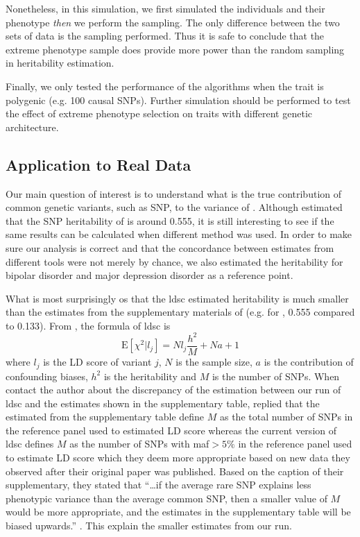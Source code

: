 \documentclass[12pt]{scrbook}
\newcommand*{\glng}{\glsentrylong}
\begin{document}
Nonetheless, in this simulation, we first simulated the individuals and their phenotype \emph{then} we perform the sampling.
The only difference between the two sets of data is the sampling performed.
Thus it is safe to conclude that the extreme phenotype sample does provide more power than the random sampling in heritability estimation.

Finally, we only tested the performance of the algorithms when the trait is polygenic (e.g. 100 causal \glspl{SNP}).
Further simulation should be performed to test the effect of extreme phenotype selection on traits with different genetic architecture. 

\subsection{Application to Real Data}
Our main question of interest is to understand what is the true contribution of common genetic variants, such as \gls{SNP}, to the variance of \glng{scz}.
Although \citet{Bulik-Sullivan2015c} estimated that the \gls{SNP} heritability of \glng{scz} is around 0.555, it is still interesting to see if the same results can be calculated when different method was used. 
In order to make sure our analysis is correct and that the concordance between estimates from different tools were not merely by chance, we also estimated the heritability for bipolar disorder and major depression disorder as a reference point.

What is most surprisingly os that the \gls{ldsc} estimated heritability is much smaller than the estimates from the supplementary materials of \citet{Bulik-Sullivan2015} (e.g. for \glng{scz}, 0.555 compared to 0.133).
From \citet{Bulik-Sullivan2015}, the formula of \gls{ldsc} is
\begin{equation}
\mathrm{E}[\chi^2|l_j] = Nl_j\frac{h^2}{M}+Na+1
\end{equation}
where $l_j$ is the \gls{LD} score of variant $j$, $N$ is the sample size, $a$ is the contribution of confounding biases, $h^2$ is the heritability and $M$ is the number of \glspl{SNP}.
When contact the author about the discrepancy of the estimation between our run of \gls{ldsc} and the estimates shown in the supplementary table, \citet{Bulik-Sullivan2015c} replied that the estimated from the supplementary table define $M$ as the total number of \glspl{SNP} in the reference panel used to estimated \gls{LD} score whereas the current version of \gls{ldsc} defines $M$ as the number of \glspl{SNP} with \gls{maf}$ >5\%$ in the reference panel used to estimate \gls{LD} score which they deem more appropriate based on new data they observed after their original paper was published.
Based on the caption of their supplementary, they stated that ``\dots if the average rare \gls{SNP} explains less phenotypic variance than the average common \gls{SNP}, then a smaller value of $M$ would be more appropriate, and the estimates in the supplementary table will be biased upwards.'' \citep{Bulik-Sullivan2015}.
This explain the smaller estimates from our run. 
\end{document}
